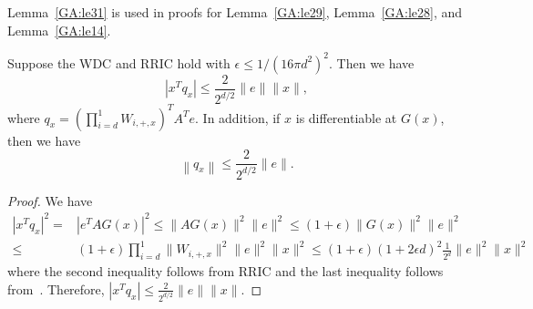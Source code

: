 Lemma~\ref{GA:le31} is used in proofs for Lemma~\ref{GA:le29}, Lemma~\ref{GA:le28}, and Lemma~\ref{GA:le14}.
\begin{lemma} \label{GA:le31}
Suppose the WDC and RRIC
hold with $\epsilon \leq 1 / (16 \pi d^2)^2$. Then we have
$$
\left|x^T q_x\right| \leq \frac{2}{2^{d/2}} \|e\| \|x\|,
$$
where $q_x = \left(\prod_{i = d}^1 W_{i, +, x}\right)^T A^T e$. In addition, if $x$ is differentiable at $G(x)$, then we have
\begin{equation*}
\left\|q_x\right\| \leq \frac{2}{2^{d/2}} \|e\|.
\end{equation*}
\end{lemma}
\begin{proof}
We have
\begin{align*}
|x^T q_x|^2 =& |e^T A G(x)|^2 \leq \|A G(x)\|^2 \|e\|^2 \leq (1 + \epsilon) \|G(x)\|^2 \|e\|^2 \\
\leq& (1 + \epsilon) \prod_{i = d}^1\| W_{i, +, x} \|^2 \|e\|^2 \|x\|^2 \leq (1 + \epsilon) (1 + 2 \epsilon d)^2 \frac{1}{ 2^{d}} \|e\|^2 \|x\|^2
\end{align*}
where the second inequality follows from RRIC and the last inequality follows from~\cite[(10)]{HV17}. Therefore, $\left|x^T q_x\right| \leq \frac{2}{2^{d/2}} \|e\| \|x\|$.



\end{proof}

